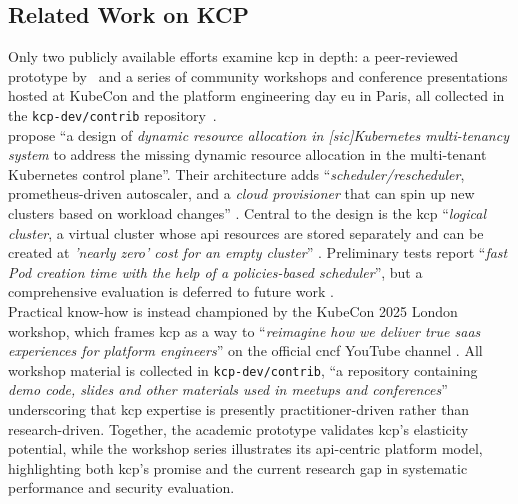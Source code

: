 \documentclass[11pt, a4paper, oneside, listof=totoc]{scrartcl}
\newcommand{\sic}{\textnormal{\textit{[sic]}}}
\begin{document}
            \cleardoublepage

        \subsection{Related Work on KCP}\label{subsec:relatedKCP}
            Only two publicly available efforts examine \gls{kcp} in depth: a peer-reviewed
            prototype by~\cite{nguyen2022} and a series of community workshops and conference
            presentations hosted at KubeCon and the platform engineering day \gls{eu} in Paris, all
            collected in the \texttt{kcp-dev/contrib} repository~\cite{kcpContrib}.
            \\
            \textcite{nguyen2022} propose \enquote{a design of
            \textit{dynamic resource allocation in \sic Kubernetes multi-tenancy system} to address
            the missing dynamic resource allocation in the multi-tenant Kubernetes control plane}.
            Their architecture adds \enquote{\textit{scheduler/rescheduler}, \gls{prometheus}-driven
            autoscaler, and a \textit{cloud provisioner} that can spin up new clusters based on
            workload changes} \parencite[p.~653]{nguyen2022}.
            Central to the design is the \gls{kcp} \enquote{\textit{logical cluster}, a virtual
            cluster whose \gls{api} resources are stored separately and can be created at
            \textit{'nearly zero' cost for an empty cluster}} \parencite[p.~652]{nguyen2022}.
            Preliminary tests report \enquote{\textit{fast Pod creation time with the help of a
            policies-based scheduler}}, but a comprehensive evaluation is deferred to future work
            \parencites[p.~651]{nguyen2022}[p.~654]{nguyen2022}.
            \\
            Practical know-how is instead championed by the KubeCon 2025 London workshop, which
            frames \gls{kcp} as a way to \enquote{\textit{reimagine how we deliver true \gls{saas}
            experiences for platform engineers}} on the official \gls{cncf} YouTube channel
            \parencite{kubeconLondonYT}.
            All workshop material is collected in \texttt{kcp-dev/contrib}, \enquote{a repository
            containing
            \textit{demo code, slides and other materials used in meetups and conferences}}
            \parencite{kcpContrib} underscoring that \gls{kcp} expertise is presently
            practitioner-driven rather than research-driven.
            Together, the academic prototype validates \gls{kcp}'s elasticity potential, while the
            workshop series illustrates its \gls{api}-centric platform model, highlighting both
            \gls{kcp}'s promise and the current research gap in systematic performance and security
            evaluation.
\end{document}
